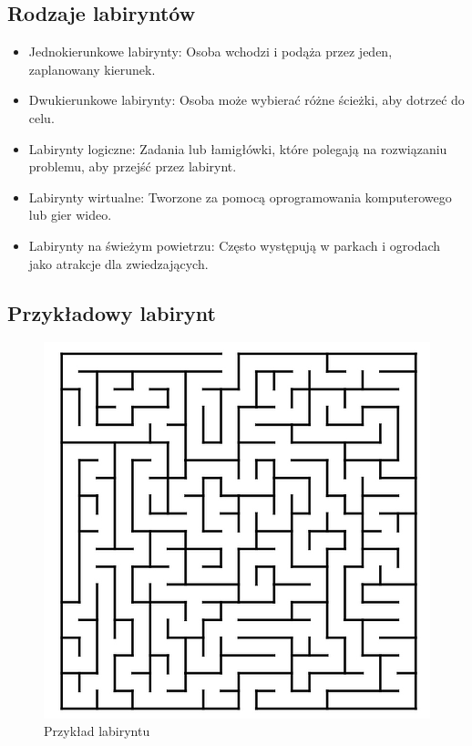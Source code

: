 \subsection{Rodzaje labiryntów}
\begin{itemize}
    \item Jednokierunkowe labirynty: Osoba wchodzi i podąża przez jeden, zaplanowany kierunek.
    \item Dwukierunkowe labirynty: Osoba może wybierać różne ścieżki, aby dotrzeć do celu.
    \item Labirynty logiczne: Zadania lub łamigłówki, które polegają na rozwiązaniu problemu, aby przejść przez labirynt.
    \item Labirynty wirtualne: Tworzone za pomocą oprogramowania komputerowego lub gier wideo.
    \item Labirynty na świeżym powietrzu: Często występują w parkach i ogrodach jako atrakcje dla zwiedzających. 
\end{itemize}

\subsection{Przykładowy labirynt}
\begin{figure}[hbt!]
    \centering
    \includegraphics{pictures/labirynt.jpg}
    \caption{Przykład labiryntu}
    \label{fig:labirynt}
\end{figure}


